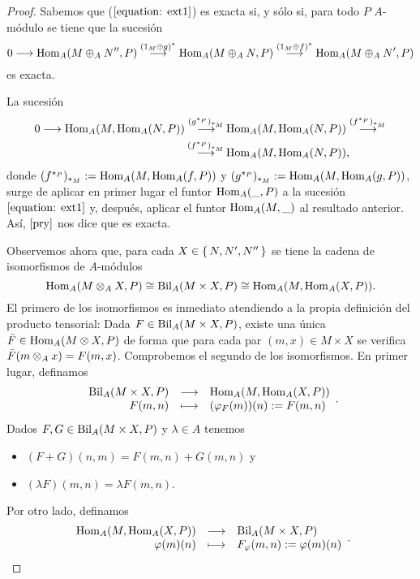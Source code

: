 \documentclass[../main.tex]{subfiles}
\begin{document}
\begin{proof}
	Sabemos que ($\ref{equation: ext1}$) es exacta si, y sólo si, para todo $P$ $A$-módulo se tiene que la sucesión
	\begin{equation}\label{equation: ext3}
	0\longrightarrow\operatorname{Hom}_A(M\oplus_A N'',P)\overset{(1_M\oplus g)^*}{\longrightarrow}\operatorname{Hom}_A(M\oplus_A N,P)\overset{(1_M\oplus f)^*}{\longrightarrow}\operatorname{Hom}_A(M\oplus_A N',P)
	\end{equation}
	es exacta.

	La sucesión
	\begin{align*}\label{equation: ext4}
	0\longrightarrow\operatorname{Hom}_A(M,\operatorname{Hom}_A(N,P))\overset{(g^{*_P})_{*_M}}{\longrightarrow}&\operatorname{Hom}_A(M,\operatorname{Hom}_A(N,P))\overset{(f^{*_P})_{*_M}}{\longrightarrow}\\
	\overset{(f^{*_P})_{*_M}}{\longrightarrow}&\operatorname{Hom}_A(M,\operatorname{Hom}_A(N,P)),
	\end{align*}
	donde $(f^{*_P})_{*_M}:=\operatorname{Hom}_A(M,\operatorname{Hom}_A(f,P))$ y $(g^{*_P})_{*_M}:=\operatorname{Hom}_A(M,\operatorname{Hom}_A(g,P))$, surge de aplicar en primer lugar el funtor $\operatorname{Hom}_A(\_,P)$ a la sucesión $\ref{equation: ext1}$ y, después, aplicar el funtor $\operatorname{Hom}_A(M,\_)$ al resultado anterior. Así, $\ref{pry}$ nos dice que es exacta.

	Observemos ahora que, para cada $X\in\set{N,N',N''}$ se tiene la cadena de isomorfismos de $A$-módulos
	$$\operatorname{Hom}_A(M\otimes_A X,P)\cong\operatorname{Bil}_A(M\times X,P)\cong\operatorname{Hom}_A(M,\operatorname{Hom}_A(X,P)).$$
	El primero de los isomorfismos es inmediato atendiendo a la propia definición del producto tensorial: Dada $F\in\operatorname{Bil}_A(M\times X,P)$, existe una única $\Bar{F}\in\operatorname{Hom}_A(M\otimes X,P)$ de forma que para cada par $(m,x)\in M\times X$ se verifica $\Bar{F}(m\otimes_A x)=F(m,x)$. Comprobemos el segundo de los isomorfismos. En primer lugar, definamos
	$$\begin{array}{rcl}
	\operatorname{Bil}_A(M\times X,P)&\longrightarrow&\operatorname{Hom}_A(M,\operatorname{Hom}_A(X,P))\\
	F(m,n)&\longmapsto&(\varphi_F(m))(n):=F(m,n)
	\end{array}.$$
	Dados $F,G\in\operatorname{Bil}_A(M\times X,P)$ y $\lambda\in A$ tenemos
	\begin{itemize}
		\item $(F+G)(n,m)=F(m,n)+G(m,n)$ y
		\item $(\lambda F)(m,n)=\lambda F(m,n).$
	\end{itemize}

	Por otro lado, definamos
	$$\begin{array}{rcl}
	\operatorname{Hom}_A(M,\operatorname{Hom}_A(X,P))&\longrightarrow&\operatorname{Bil}_A(M\times X,P)\\
	\varphi(m)(n)&\longmapsto&F_\varphi(m,n):=\varphi(m)(n)
	\end{array}.$$


\end{proof}
\end{document}

